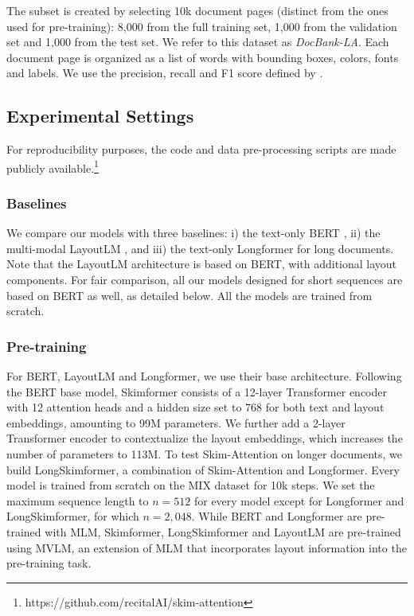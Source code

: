 The subset is created by selecting 10k document pages (distinct from the ones used for pre-training): 8,000 from the full training set, 1,000 from the validation set and 1,000 from the test set. We refer to this dataset as \textit{DocBank-LA}. Each document page is organized as a list of words with bounding boxes, colors, fonts and labels. We use the precision, recall and F1 score defined by \citet{li2020docbank}.

\subsection{Experimental Settings}

For reproducibility purposes, the code and data pre-processing scripts are made publicly available.\footnote{https://github.com/recitalAI/skim-attention}

\subsubsection{Baselines}

We compare our models with three baselines: i) the text-only \ac{BERT} \citep{devlin2018bert}, ii) the multi-modal LayoutLM \citep{xu2020layoutlm}, and iii) the text-only Longformer \citep{beltagy2020longformer} for long documents. Note that the LayoutLM architecture is based on \ac{BERT}, with additional layout components. For fair comparison, all our models designed for short sequences are based on \ac{BERT} as well, as detailed below. All the models are trained from scratch.

\subsubsection{Pre-training}

For \ac{BERT}, LayoutLM and Longformer, we use their base architecture. Following the \ac{BERT} base model, Skimformer consists of a 12-layer Transformer encoder with 12 attention heads and a hidden size set to 768 for both text and layout embeddings, amounting to 99M parameters. We further add a 2-layer Transformer encoder to contextualize the layout embeddings, which increases the number of parameters to 113M. To test Skim-Attention on longer documents, we build LongSkimformer, a combination of Skim-Attention and Longformer. Every model is trained from scratch on the MIX dataset for 10k steps. We set the maximum sequence length to $n = 512$ for every model except for Longformer and LongSkimformer, for which $n = 2,048$. While \ac{BERT} and Longformer are pre-trained with \ac{MLM}, Skimformer, LongSkimformer and LayoutLM are pre-trained using \ac{MVLM}, an extension of \ac{MLM} that incorporates layout information into the pre-training task. 

